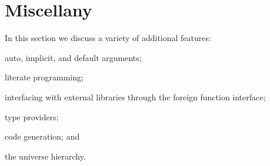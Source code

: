 \section{Miscellany}

In this section we discuss a variety of additional features:

\begin{multicols}{2}
  \begin{compactitem}
  \item auto, implicit, and default arguments;
  \item literate programming;
  \item interfacing with external libraries through the foreign function interface;
  \item type providers;
  \item code generation; and
  \item the universe hierarchy.
  \end{compactitem}
\end{multicols}








